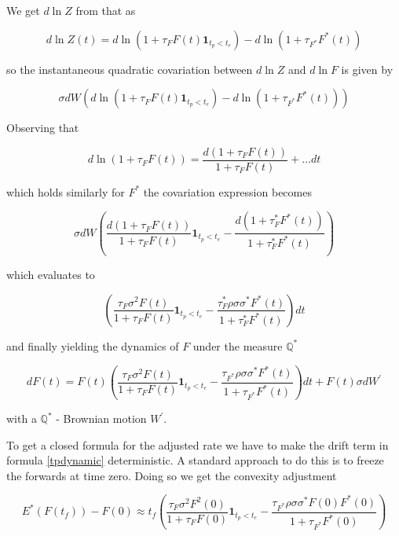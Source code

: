 \documentclass{amsart}
\theoremstyle{plain}
\numberwithin{equation}{section}
\begin{document}
We get $d\ln{Z}$ from that as

\begin{equation}
d\ln{Z(t)} = d\ln{(1+\tau_F F(t)\textbf{1}_{t_p < t_e})} - d\ln{(1+\tau_{F^*} F^*(t))}
\end{equation}

so the instantaneous quadratic covariation between $d\ln{Z}$ and $d\ln{F}$ is given by

\begin{equation}
\sigma dW (d\ln{(1+\tau_F F(t)\textbf{1}_{t_p < t_e})} - d\ln{(1+\tau_{F^*} F^*(t))})
\end{equation}

Observing that

\begin{equation}
d\ln(1+\tau_F F(t)) = \frac{d(1+\tau_F F(t))}{1+\tau_F F(t)} + \ldots dt
\end{equation}

which holds similarly for $F^*$ the covariation expression becomes

\begin{equation}
\sigma dW \left( \frac{d(1+\tau_F F(t))}{1+\tau_F F(t)}\textbf{1}_{t_p < t_e} - \frac{d(1+\tau_F^* F^*(t))}{1+\tau_F^* F^*(t)} \right) 
\end{equation}

which evaluates to

\begin{equation}
\left(\frac{\tau_F \sigma^2 F(t)}{1+\tau_F F(t)} \textbf{1}_{t_p<t_e} - \frac{\tau_F^* \rho\sigma\sigma^* F^*(t)}{1+\tau_F^* F^*(t)}\right) dt
\end{equation}

and finally yielding the dynamics of $F$ under the measure $\mathbb{Q}^*$

\begin{equation}\label{tpdynamic}
dF(t) = F(t) \left(\frac{\tau_F \sigma^2 F(t)}{1+\tau_F F(t)} \textbf{1}_{t_p<t_e} - \frac{\tau_{F^*} \rho\sigma\sigma^* F^*(t)}{1+\tau_{F^*} F^*(t)}\right) dt + F(t) \sigma dW^\prime
\end{equation}

with a $\mathbb{Q^*}$ - Brownian motion $W^\prime$.

To get a closed formula for the adjusted rate we have to make the drift term in formula \ref{tpdynamic} deterministic. A standard approach to do this
is to freeze the forwards at time zero. Doing so we get the convexity adjustment

\begin{equation}\label{adjustment}
E^*(F(t_f)) - F(0) \approx t_f \left(\frac{\tau_F \sigma^2 F^2(0)}{1+\tau_F F(0)} \textbf{1}_{t_p<t_e} - \frac{\tau_{F^*} \rho\sigma\sigma^*F(0) F^*(0)}{1+\tau_{F^*} F^*(0)}\right)
\end{equation}
\end{document}
